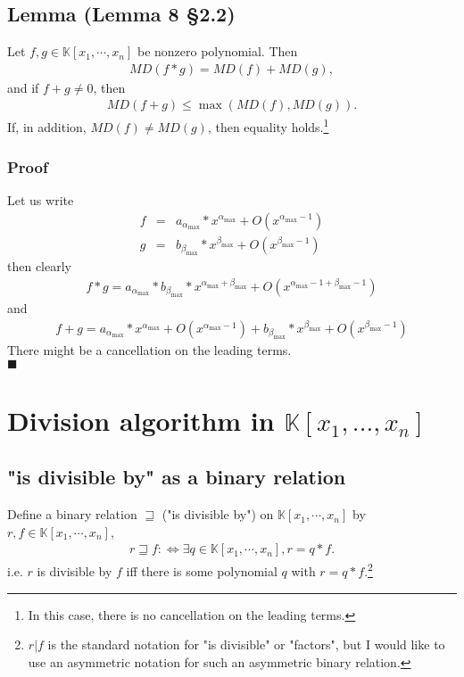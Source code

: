\documentclass[11pt]{book}
\begin{document}
\subsection{Lemma (Lemma 8 \S2.2)}
\label{multiplication}
Let $f, g \in \mathbb{K}[x_1, \cdots, x_n]$ be nonzero polynomial.
Then
\begin{eqnarray}
MD(f * g) = MD(f) + MD(g),
\end{eqnarray}
and if $f+g \neq 0$, then
\begin{eqnarray}
MD(f+g) \leq \max(MD(f), MD(g)).
\end{eqnarray}
If, in addition, $MD(f) \neq MD(g)$, then equality holds.\footnote{In this case, there is no cancellation on the leading terms.}

\subsubsection{Proof}
Let us write
\begin{eqnarray}
f &=& a_{\alpha_{\max}} * x^{\alpha_{\max}} + O(x^{\alpha_{\max}-1}) \\
g &=& b_{\beta_{\max}} * x^{\beta_{\max}} + O(x^{\beta_{\max}-1})
\end{eqnarray}
then clearly
\begin{eqnarray}
f*g = a_{\alpha_{\max}} * b_{\beta_{\max}} * x^{\alpha_{\max}+\beta_{\max}} + O(x^{\alpha_{\max}-1+\beta_{\max} -1})
\end{eqnarray}
and
\begin{eqnarray}
f + g =  a_{\alpha_{\max}} * x^{\alpha_{\max}} + O(x^{\alpha_{\max}-1}) + b_{\beta_{\max}} * x^{\beta_{\max}} + O(x^{\beta_{\max}-1}) 
\end{eqnarray}
There might be a cancellation on the leading terms.\\
$\blacksquare$

\section{Division algorithm in $\mathbb{K}[x_1, ... , x_n]$}
\subsection{"is divisible by" as a binary relation}
\label{isDivisibleBy}
Define a binary relation $\sqsupseteq$ ("is divisible by") on $\mathbb{K}[x_1, \cdots, x_n]$ by $r,f \in \mathbb{K}[x_1, \cdots, x_n]$,
\begin{eqnarray}
r \sqsupseteq f :\Leftrightarrow \exists q \in \mathbb{K}[x_1, \cdots, x_n], r = q*f.
\end{eqnarray}
i.e. $r$ is divisible by $f$ iff there is some polynomial $q$ with $r = q*f$.\footnote{$r|f$ is the standard notation for "is divisible" or "factors", but I would like to use an asymmetric notation for such an asymmetric binary relation.}
\end{document}
